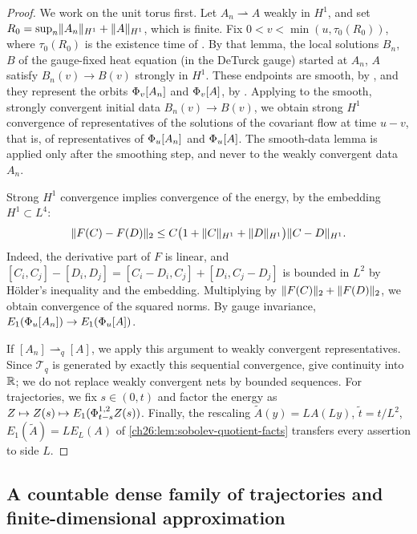 \begin{proof}
We work on the unit torus first. Let $A_n\rightharpoonup A$ weakly in $H^1$, and set $R_0=\sup_n\lVert A_n\rVert_{H^1}+\lVert A\rVert_{H^1}$, which is finite. Fix $0<v<\min(u,\tau_0(R_0))$, where $\tau_0(R_0)$ is the existence time of \cite[Lemma 3.23, pp.~27--28]{CCState2023v4}. By that lemma, the local solutions $B_n$, $B$ of the gauge-fixed heat equation (in the DeTurck gauge) started at $A_n$, $A$ satisfy $B_n(v)\to B(v)$ strongly in $H^1$. These endpoints are smooth, by \cite[Proposition 3.19, pp.~26--27]{CCState2023v4}, and they represent the orbits $\Phi_v[A_n]$ and $\Phi_v[A]$, by \cite[Lemma 3.21, p.~27]{CCState2023v4}. Applying \cite[Lemma 3.15, p.~25]{CCState2023v4} to the smooth, strongly convergent initial data $B_n(v)\to B(v)$, we obtain strong $H^1$ convergence of representatives of the solutions of the covariant flow at time $u-v$, that is, of representatives of $\Phi_u[A_n]$ and $\Phi_u[A]$. The smooth-data lemma is applied only after the smoothing step, and never to the weakly convergent data $A_n$.

Strong $H^1$ convergence implies convergence of the energy, by the embedding $H^1\subset L^4$:
\[
 \lVert F(C)-F(D)\rVert_2\le C\bigl(1+\lVert C\rVert_{H^1}+\lVert D\rVert_{H^1}\bigr)\lVert C-D\rVert_{H^1}.
\]
Indeed, the derivative part of $F$ is linear, and $[C_i,C_j]-[D_i,D_j]=[C_i-D_i,C_j]+[D_i,C_j-D_j]$ is bounded in $L^2$ by H\"older's inequality and the embedding. Multiplying by $\lVert F(C)\rVert_2+\lVert F(D)\rVert_2$, we obtain convergence of the squared norms. By gauge invariance, $E_1(\Phi_u[A_n])\to E_1(\Phi_u[A])$.

If $[A_n]\rightharpoonup_q[A]$, we apply this argument to weakly convergent representatives. Since $\mathcal T_q$ is generated by exactly this sequential convergence, \cite[Lemma 3.38 and Corollary 3.39, p.~32; Lemma 3.41, p.~33]{CCState2023v4} give continuity into $\mathbb R$; we do not replace weakly convergent nets by bounded sequences. For trajectories, we fix $s\in(0,t)$ and factor the energy as $Z\mapsto Z(s)\mapsto E_1(\Phi^{1,2}_{t-s}Z(s))$. Finally, the rescaling $\widetilde A(y)=LA(Ly)$, $\widetilde t=t/L^2$, $E_1(\widetilde A)=LE_L(A)$ of \cref{ch26:lem:sobolev-quotient-facts} transfers every assertion to side $L$.
\end{proof}

\subsection{A countable dense family of trajectories and finite-dimensional approximation}

